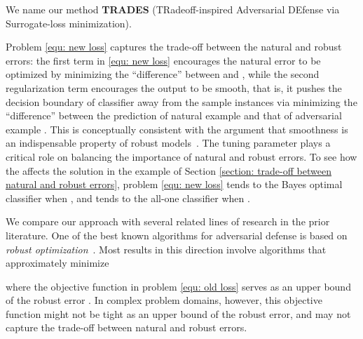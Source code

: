 \documentclass[11pt]{article}
\newcommand{\0}{\mathbf{0}}
\newcommand{\1}{\mathbf{1}}
\begin{document}
We name our method \textbf{TRADES} (TRadeoff-inspired Adversarial DEfense via Surrogate-loss minimization).

\medskip
{}
Problem \eqref{equ: new loss}  captures the trade-off between the natural and robust errors: the first term in \eqref{equ: new loss} encourages the natural error to be optimized by minimizing the ``difference'' between  and , while the second regularization term encourages the output to be smooth, that is, it pushes the decision boundary of classifier away from the sample instances via minimizing the ``difference'' between the prediction of natural example  and that of adversarial example . This is conceptually consistent with the argument that smoothness is an indispensable property of robust models~\cite{cisse2017parseval}. The tuning parameter  plays a critical role on balancing the importance of natural and robust errors. To see how the  affects the solution in the example of Section \ref{section: trade-off between natural and robust errors}, problem \eqref{equ: new loss} tends to the Bayes optimal classifier when , and tends to the all-one classifier when .



\medskip
{}
We compare our approach with several related lines of research in the prior literature.  One of the best known algorithms for adversarial defense is based on  \emph{robust optimization}~\cite{madry2018towards,kolter2017provable,wong1805scaling,raghunathan2018certified,raghunathan2018semidefinite}. Most results in this direction involve algorithms that approximately minimize

where the objective function in problem \eqref{equ: old loss} serves as an upper bound of the robust error . In complex problem domains, however, this objective function might not be tight as an upper bound of the robust error, and may not capture the trade-off between natural and robust errors. 
\end{document}
